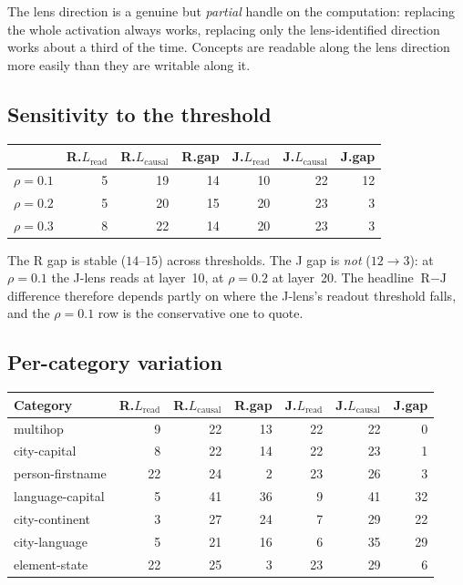 \documentclass[11pt,a4paper]{article}
\newcommand{\jlens}{J\nobreakdash-lens}
\newcommand{\Lread}{L_{\text{read}}}
\newcommand{\Lcaus}{L_{\text{causal}}}
\begin{document}
\noindent
The lens direction is a genuine but \emph{partial} handle on the computation:
replacing the whole activation always works, replacing only the lens-identified
direction works about a third of the time. Concepts are readable along the lens
direction more easily than they are writable along it.

\subsection{Sensitivity to the threshold}

\begin{center}
\begin{tabular}{@{}lrrrrrr@{}}
\toprule
 & \textbf{R.$\Lread$} & \textbf{R.$\Lcaus$} & \textbf{R.gap} & \textbf{J.$\Lread$} & \textbf{J.$\Lcaus$} & \textbf{J.gap} \\
\midrule
$\rho = 0.1$ & 5 & 19 & 14 & 10 & 22 & 12 \\
$\rho = 0.2$ & 5 & 20 & 15 & 20 & 23 & \phantom{0}3 \\
$\rho = 0.3$ & 8 & 22 & 14 & 20 & 23 & \phantom{0}3 \\
\bottomrule
\end{tabular}
\end{center}

\noindent
The R gap is stable ($14$--$15$) across thresholds. The J gap is \emph{not}
($12 \to 3$): at $\rho = 0.1$ the \jlens{} reads at layer~10, at $\rho = 0.2$ at
layer~20. The headline $\text{R}-\text{J}$ difference therefore depends partly on
where the \jlens's readout threshold falls, and the $\rho = 0.1$ row is the
conservative one to quote.

\subsection{Per-category variation}

\begin{center}
\begin{tabular}{@{}lrrrrrr@{}}
\toprule
\textbf{Category} & \textbf{R.$\Lread$} & \textbf{R.$\Lcaus$} & \textbf{R.gap} & \textbf{J.$\Lread$} & \textbf{J.$\Lcaus$} & \textbf{J.gap} \\
\midrule
multihop         &  9 & 22 & 13 & 22 & 22 & \phantom{0}0 \\
city-capital     &  8 & 22 & 14 & 22 & 23 & \phantom{0}1 \\
person-firstname & 22 & 24 & \phantom{0}2 & 23 & 26 & \phantom{0}3 \\
language-capital &  5 & 41 & 36 &  9 & 41 & 32 \\
city-continent   &  3 & 27 & 24 &  7 & 29 & 22 \\
city-language    &  5 & 21 & 16 &  6 & 35 & 29 \\
element-state    & 22 & 25 & \phantom{0}3 & 23 & 29 & \phantom{0}6 \\
\bottomrule
\end{tabular}
\end{center}
\end{document}
